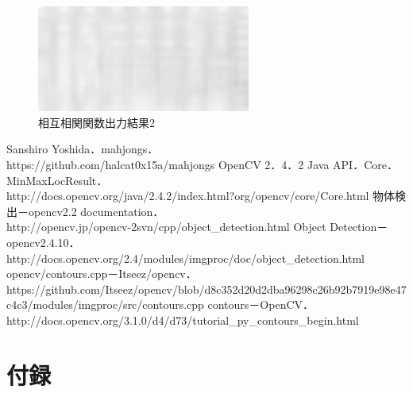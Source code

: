 \documentclass{jsarticle}
\begin{document}
\begin{multicols}{2}
\begin{figure}[H]
  \begin{center}
    \includegraphics[clip,width=7.0cm]{./img/res2.png}
    \caption{相互相関関数出力結果2}
    \label{fig:res2}
  \end{center}
\end{figure}

%

\end{multicols}

\newpage

\begin{thebibliography}{9}
	Sanshiro Yoshida．mahjongs．\\
	https://github.com/halcat0x15a/mahjongs
	OpenCV 2．4．2 Java API．Core．MinMaxLocResult．\\
	http://docs.opencv.org/java/2.4.2/index.html?org/opencv/core/Core.html
	物体検出－opencv2.2 documentation． \\
	http://opencv.jp/opencv-2svn/cpp/object\_detection.html
	Object Detection－opencv2.4.10．\\
	http://docs.opencv.org/2.4/modules/imgproc/doc/object\_detection.html
	opencv/contours.cpp－Itseez/opencv． \\
	https://github.com/Itseez/opencv/blob/d8c352d20d2dba96298c26b92b7919e98e47c4c3/modules/imgproc/src/contours.cpp
   contours－OpenCV． \\
   http://docs.opencv.org/3.1.0/d4/d73/tutorial\_py\_contours\_begin.html
\end{thebibliography}



\newpage

\section{付録}
\end{document}
